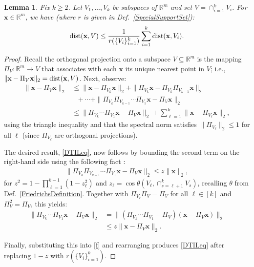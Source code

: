 \documentclass[9pt,twocolumn]{pnas-new}
\newtheorem{lemma}{Lemma}
\begin{document}
\begin{lemma}\label{DistanceToIntersectionLemma}
Fix $k \geq 2$. Let $V_1, \ldots, V_k$ be subspaces of $\mathbb{R}^m$ and set $V = \cap_{i = 1}^k V_i$. For  $\mathbf{x} \in \mathbb{R}^m$, we have (where $r$ is given in Def.~\ref{SpecialSupportSet}):
\begin{align}\label{DTILeq}
\text{\rm dist}(\mathbf{x}, V) \leq \frac{1}{r(\{V_i\}_{i = 1}^k)} \sum_{i=1}^k \text{\rm dist}(\mathbf{x}, V_i).
\end{align}
\end{lemma}
\begin{proof} 
Recall the orthogonal projection onto a subspace $V \subseteq \mathbb{R}^m$ is the mapping $\Pi_V: \mathbb{R}^m \to V$ that associates with each $\mathbf{x}$ its unique nearest point in $V$; i.e., $\|\mathbf{x} - \Pi_V\mathbf{x}\|_2 = \text{\rm dist}(\mathbf{x}, V)$.
Next, observe:
\begin{align}\label{f}
\|\mathbf{x} - \Pi_V\mathbf{x}\|_2 &\leq \|\mathbf{x} - \Pi_{V_k} \mathbf{x}\|_2 + \|\Pi_{V_k}  \mathbf{x} - \Pi_{V_k}\Pi_{V_{k-1}}\mathbf{x}\|_2 \nonumber \\
&\ \ \ + \cdots + \|\Pi_{V_k} \Pi_{V_{k-1}}\cdots \Pi_{V_1} \mathbf{x} - \Pi_V \mathbf{x}\|_2 \nonumber \\
&\leq \|\Pi_{V_k}\cdots\Pi_{V_{1}} \mathbf{x} - \Pi_V \mathbf{x}\|_2 + \sum_{\ell=1}^k \|\mathbf{x} - \Pi_{V_{\ell}} \mathbf{x}\|_2,
\end{align}
using the triangle inequality and that the spectral norm satisfies $\|\Pi_{V_{\ell}}\|_2 \leq 1$ for all $\ell$ (since $\Pi_{V_{\ell}}$ are orthogonal projections).

The desired result, \eqref{DTILeq}, now follows by bounding the second term on the right-hand side using the following fact \cite[Thm.~9.33]{Deutsch12}:
\begin{align}
\|\Pi_{V_k}\Pi_{V_{k-1}}\cdots\Pi_{V_1} \mathbf{x} - \Pi_V\mathbf{x}\|_2 \leq z \|\mathbf{x}\|_2,
\end{align}
for \mbox{$z^2= 1 - \prod_{\ell =1}^{k-1}(1-z_{\ell}^2)$} and \mbox{$z_{\ell} = \cos\theta\left(V_{\ell}, \cap_{s=\ell+1}^k V_s\right)$}, recalling $\theta$ from Def.~\ref{FriedrichsDefinition}. Together with $\Pi_{V_\ell} \Pi_V = \Pi_V$ for all $\ell \in [k]$ and $\Pi_V^2 = \Pi_V$, this yields:
\begin{align*}
\|\Pi_{V_k} \cdots \Pi_{V_1}\mathbf{x}  - \Pi_V \mathbf{x} \|_2 
&= \|\left( \Pi_{V_k} \cdots\Pi_{V_1} - \Pi_V \right) (\mathbf{x} - \Pi_V\mathbf{x})\|_2 \\
&\leq z\|\mathbf{x} - \Pi_V\mathbf{x}\|_2.
\end{align*}

Finally, substituting this into \eqref{f} and rearranging produces \eqref{DTILeq} after replacing $1 - z$ with $r(\{V_i\}_{i=1}^k)$.
\end{proof}
\end{document}
